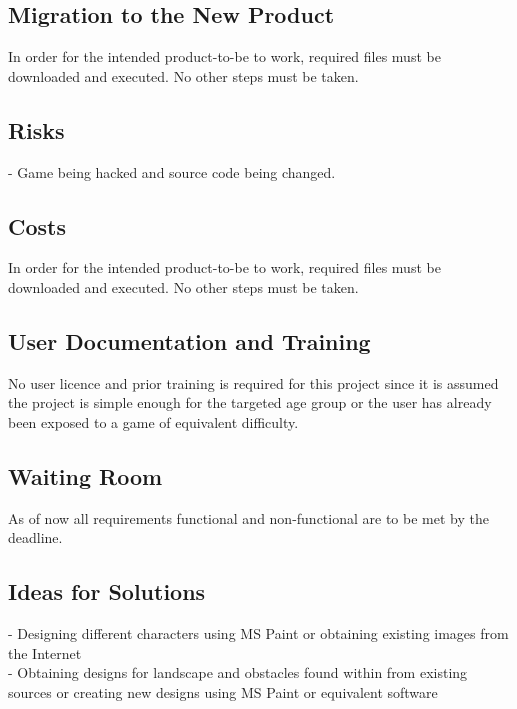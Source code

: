 \documentclass[12pt, titlepage]{article}
\begin{document}
\subsection{Migration to the New Product}
In order for the intended product-to-be to work, required files must be downloaded and executed. No other steps must be taken. \\

\subsection{Risks}
- Game being hacked and source code being changed.\\

\subsection{Costs}
In order for the intended product-to-be to work, required files must be downloaded and executed. No other steps must be taken.\\

\subsection{User Documentation and Training}
No user licence and prior training is required for this project since it is assumed the project is simple enough for the targeted age group or the user has already been exposed to a game of equivalent difficulty.\\

\subsection{Waiting Room}
As of now all requirements functional and non-functional are to be met by the deadline.\\

\subsection{Ideas for Solutions}
- Designing different characters using MS Paint or obtaining existing images from the Internet \\
- Obtaining designs for landscape and obstacles found within from existing sources or creating new designs using MS Paint or equivalent software \\





\end{document}
